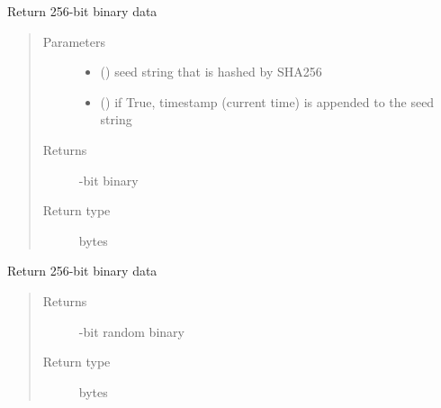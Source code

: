 \documentclass[letterpaper,10pt,english]{sphinxmanual}
\begin{document}
\begin{fulllineitems}
\label{\detokenize{bbc1.core.bbclib:bbc1.core.bbclib.get_n_bytes}}
\end{fulllineitems}


\begin{fulllineitems}
\label{\detokenize{bbc1.core.bbclib:bbc1.core.bbclib.get_new_id}}
Return 256-bit binary data
\begin{quote}\begin{description}
\item[{Parameters}] \leavevmode\begin{itemize}
\item {} 
 () \textendash{} seed string that is hashed by SHA256

\item {} 
 () \textendash{} if True, timestamp (current time) is appended to the seed string

\end{itemize}

\item[{Returns}] -bit binary

\item[{Return type}] \leavevmode
bytes

\end{description}\end{quote}

\end{fulllineitems}


\begin{fulllineitems}
\label{\detokenize{bbc1.core.bbclib:bbc1.core.bbclib.get_random_id}}
Return 256-bit binary data
\begin{quote}\begin{description}
\item[{Returns}] -bit random binary

\item[{Return type}] \leavevmode
bytes

\end{description}\end{quote}

\end{fulllineitems}
\end{document}
